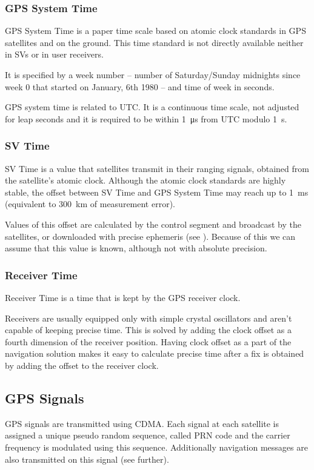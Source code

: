 \subsubsection{GPS System Time}

GPS System Time is a paper time scale based on atomic clock standards in GPS
satellites and on the ground.
This time standard is not directly available neither in SVs or in user receivers.

It is specified by a week number -- number of Saturday/Sunday midnights since week 0
that started on January, 6th 1980 -- and time of week in seconds.

GPS system time is related to UTC.
It is a continuous time scale, not adjusted for leap seconds
and it is required to be within \SI{1}{\micro\second} from UTC modulo \SI{1}{\second}.

\subsubsection{SV Time}
SV Time is a value that satellites transmit in their ranging signals,
obtained from the satellite's atomic clock.
Although the atomic clock standards are highly stable, the offset between SV
Time and GPS System Time may reach up to \SI{1}{\milli\second} (equivalent to
\SI{300}{\kilo\meter} of measurement error).

Values of this offset are calculated by the control segment
and broadcast by the satellites, or downloaded with precise ephemeris
(see ).
Because of this we can assume that this value is known, although not
with absolute precision.

\subsubsection{Receiver Time}
Receiver Time is a time that is kept by the GPS receiver clock.

Receivers are usually equipped only with simple crystal oscillators
and aren't capable of keeping precise time.
This is solved by adding the clock offset as a fourth dimension of the receiver position.
Having clock offset as a part of the navigation solution makes it easy to calculate
precise time after a fix is obtained by adding the offset to the receiver clock.

\subsection{GPS Signals}
GPS signals are transmitted using CDMA.
Each signal at each satellite is assigned a unique pseudo random sequence, called PRN code and the carrier frequency is
modulated using this sequence.
Additionally navigation messages are also transmitted on this signal (see further).

